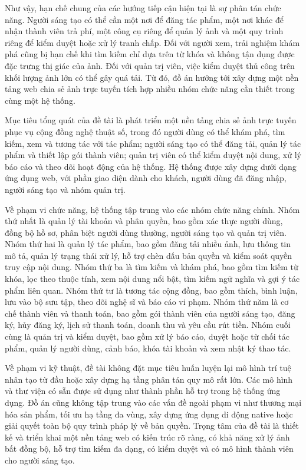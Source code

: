 Như vậy, hạn chế chung của các hướng tiếp cận hiện tại là sự phân tán chức năng. Người sáng tạo có thể cần một nơi để đăng tác phẩm, một nơi khác để nhận thành viên trả phí, một công cụ riêng để quản lý ảnh và một quy trình riêng để kiểm duyệt hoặc xử lý tranh chấp. Đối với người xem, trải nghiệm khám phá cũng bị hạn chế khi tìm kiếm chỉ dựa trên từ khóa và không tận dụng được đặc trưng thị giác của ảnh. Đối với quản trị viên, việc kiểm duyệt thủ công trên khối lượng ảnh lớn có thể gây quá tải. Từ đó, đồ án hướng tới xây dựng một nền tảng web chia sẻ ảnh trực tuyến tích hợp nhiều nhóm chức năng cần thiết trong cùng một hệ thống.

Mục tiêu tổng quát của đề tài là phát triển một nền tảng chia sẻ ảnh trực tuyến phục vụ cộng đồng nghệ thuật số, trong đó người dùng có thể khám phá, tìm kiếm, xem và tương tác với tác phẩm; người sáng tạo có thể đăng tải, quản lý tác phẩm và thiết lập gói thành viên; quản trị viên có thể kiểm duyệt nội dung, xử lý báo cáo và theo dõi hoạt động của hệ thống. Hệ thống được xây dựng dưới dạng ứng dụng web, với phần giao diện dành cho khách, người dùng đã đăng nhập, người sáng tạo và nhóm quản trị.

Về phạm vi chức năng, hệ thống tập trung vào các nhóm chức năng chính. Nhóm thứ nhất là quản lý tài khoản và phân quyền, bao gồm xác thực người dùng, đồng bộ hồ sơ, phân biệt người dùng thường, người sáng tạo và quản trị viên. Nhóm thứ hai là quản lý tác phẩm, bao gồm đăng tải nhiều ảnh, lưu thông tin mô tả, quản lý trạng thái xử lý, hỗ trợ chèn dấu bản quyền và kiểm soát quyền truy cập nội dung. Nhóm thứ ba là tìm kiếm và khám phá, bao gồm tìm kiếm từ khóa, lọc theo thuộc tính, xem nội dung nổi bật, tìm kiếm ngữ nghĩa và gợi ý tác phẩm liên quan. Nhóm thứ tư là tương tác cộng đồng, bao gồm thích, bình luận, lưu vào bộ sưu tập, theo dõi nghệ sĩ và báo cáo vi phạm. Nhóm thứ năm là cơ chế thành viên và thanh toán, bao gồm gói thành viên của người sáng tạo, đăng ký, hủy đăng ký, lịch sử thanh toán, doanh thu và yêu cầu rút tiền. Nhóm cuối cùng là quản trị và kiểm duyệt, bao gồm xử lý báo cáo, duyệt hoặc từ chối tác phẩm, quản lý người dùng, cảnh báo, khóa tài khoản và xem nhật ký thao tác.

Về phạm vi kỹ thuật, đề tài không đặt mục tiêu huấn luyện lại mô hình trí tuệ nhân tạo từ đầu hoặc xây dựng hạ tầng phân tán quy mô rất lớn. Các mô hình và thư viện có sẵn được sử dụng như thành phần hỗ trợ trong hệ thống ứng dụng. Đồ án cũng không tập trung vào các vấn đề ngoài phạm vi như thương mại hóa sản phẩm, tối ưu hạ tầng đa vùng, xây dựng ứng dụng di động native hoặc giải quyết toàn bộ quy trình pháp lý về bản quyền. Trọng tâm của đề tài là thiết kế và triển khai một nền tảng web có kiến trúc rõ ràng, có khả năng xử lý ảnh bất đồng bộ, hỗ trợ tìm kiếm đa dạng, có kiểm duyệt và có mô hình thành viên cho người sáng tạo.

